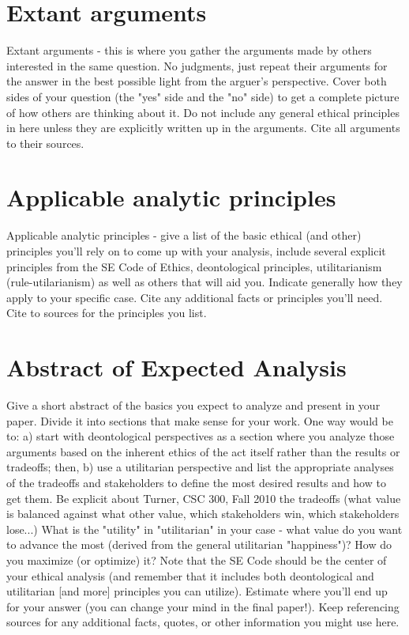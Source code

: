 \documentclass[12pt]{article}
\begin{document}
\section{Extant arguments}
Extant arguments - this is where you gather the arguments made by others interested in the same question. No judgments, just repeat their arguments for the answer in the best possible light from the arguer's perspective. Cover both sides of your question (the "yes" side and the "no" side) to get a complete picture of how others are thinking about it. Do not include any general ethical principles in here unless they are explicitly written up in the arguments. Cite all arguments to their sources. \cite{handout}

\section{Applicable analytic principles}
Applicable analytic principles - give a list of the basic ethical (and other) principles you'll rely on to come up with your analysis, include several explicit principles from the SE Code of Ethics, deontological principles, utilitarianism (rule-utilarianism) as well as others that will aid you. Indicate generally how they apply to your specific case. Cite any additional facts or principles you'll need. Cite to sources for the principles you list. \cite{handout}  

\section{Abstract of Expected Analysis}
Give a short abstract of the basics you expect to analyze and present in your paper. Divide it into sections that make sense for your work.
One way would be to: a) start with deontological perspectives as a section where you analyze those arguments based on the inherent ethics of the act itself rather than the results or tradeoffs; then, b) use a utilitarian perspective and list the appropriate analyses of the tradeoffs and stakeholders to define the most desired results and how to get them. Be explicit about
Turner, CSC 300, Fall 2010
the tradeoffs (what value is balanced against what other value, which stakeholders win, which stakeholders lose...) What is the "utility" in "utilitarian" in your case - what value do you want to advance the most (derived from the general utilitarian "happiness")? How do you maximize (or optimize) it?
Note that the SE Code should be the center of your ethical analysis (and remember that it includes both deontological and utilitarian [and more] principles you can utilize). Estimate where you'll end up for your answer (you can change your mind in the final paper!). Keep referencing sources for any additional facts, quotes, or other information you might use here. \cite{handout}

\nocite{texTemp}
\nocite{BibTex}
\nocite{BibMang}
\nocite{bibStyle}




\end{document}
